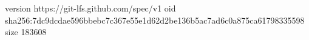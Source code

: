 version https://git-lfs.github.com/spec/v1
oid sha256:7dc9dcdae596bbebc7c367e55e1d62d2be136b5ac7ad6c0a875ca61798335598
size 183608
